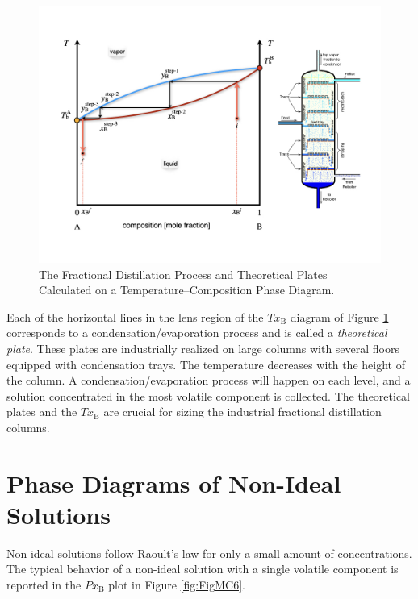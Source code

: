 \documentclass[
  9pt,
]{extbook}
\theoremstyle{definition}
\theoremstyle{definition}
\theoremstyle{definition}
\theoremstyle{remark}
\begin{document}
\begin{figure}

{\centering \includegraphics[width=0.6\linewidth]{./img/OEP_Figures.023} 

}

\caption{The Fractional Distillation Process and Theoretical Plates Calculated on a Temperature–Composition Phase Diagram.}\label{fig:FigMC5}
\end{figure}

Each of the horizontal lines in the lens region of the \(Tx_{\text{B}}\) diagram of Figure \ref{fig:FigMC5} corresponds to a condensation/evaporation process and is called a \emph{theoretical plate}. These plates are industrially realized on large columns with several floors equipped with condensation trays. The temperature decreases with the height of the column. A condensation/evaporation process will happen on each level, and a solution concentrated in the most volatile component is collected. The theoretical plates and the \(Tx_{\text{B}}\) are crucial for sizing the industrial fractional distillation columns.

\hypertarget{phase-diagrams-of-non-ideal-solutions}{%
\section{Phase Diagrams of Non-Ideal Solutions}\label{phase-diagrams-of-non-ideal-solutions}}

Non-ideal solutions follow Raoult's law for only a small amount of concentrations. The typical behavior of a non-ideal solution with a single volatile component is reported in the \(Px_{\text{B}}\) plot in Figure \ref{fig:FigMC6}.
\end{document}
